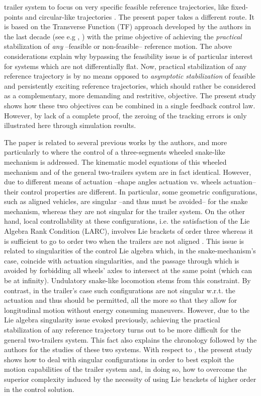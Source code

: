\documentclass[a4paper,twoside]{article}
\begin{document}
trailer system to focus on very specific feasible reference trajectories, like fixed-points \cite{lms01,vo00} and circular-like 
trajectories \cite{lms01}. The present paper takes a different route. It is based on the Transverse 
Function (TF) approach developed by the authors in the last decade 
(see e.g \cite{ms01-siam}, \cite{ms03}) with the prime objective of achieving the  
{\em practical} stabilization of {\em any} --feasible or non-feasible-- reference motion. The above considerations explain why bypassing the feasibility issue is 
of particular interest for systems which are not differentially flat. Now, practical stabilization of any reference trajectory is by no means opposed to 
{\em asymptotic stabilization} of feasible and persistently exciting reference trajectories, which should rather be considered as a complementary, more demanding 
and restritive, objective. The present study shows how these two objectives can be combined in a single feedback control law. However, by lack of a complete proof, 
the zeroing of the tracking errors is only illustrated here through simulation results. 

The paper is related to several previous works by the authors, and more particularly 
to \cite{ms10-cdc} where the control of a three-segments wheeled snake-like mechanism is addressed. 
The kinematic model equations of this wheeled mechanism and of the general two-trailers system are in fact identical. However, due to different means of 
actuation --shape angles actuation vs. wheels actuation--  their control properties are different. In particular,
some geometric configurations, such as aligned vehicles, are singular --and thus must be avoided-- for the snake mechanism, whereas they are not singular for 
the trailer system. On the other hand, local controllability at these configurations, i.e. the satisfaction of the Lie Algebra Rank Condition (LARC), involves 
Lie brackets of order three whereas it is sufficient to go to order two when the trailers are not aligned \cite{ms10-cdc}. This issue is related to singularities
of the control Lie algebra \cite{vlo99} which, in the snake-mechanism's case, coincide with actuation singularities, and the passage through which is avoided by 
forbidding all wheels' axles to intersect at the same point (which can be at infinity). Undulatory snake-like locomotion stems from this constraint. By contrast, 
in the trailer's case such configurations are not singular w.r.t. the actuation and thus should be permitted, all the more so that they allow for longitudinal 
motion without energy consuming  maneuvers. However, due to the Lie algebra singularity issue evoked previously, achieving the practical stabilization of any 
reference trajectory turns out to be more difficult for the general two-trailers system. This fact also explains the chronology followed by the authors for the 
studies of these two systems. With respect to \cite{ms10-cdc}, the present study shows how to deal with singular configurations in order to best exploit the 
motion capabilities of the trailer system and, in doing so, how to overcome the superior complexity induced by the necessity of using Lie brackets of higher 
order in the control solution.
  
\end{document}
